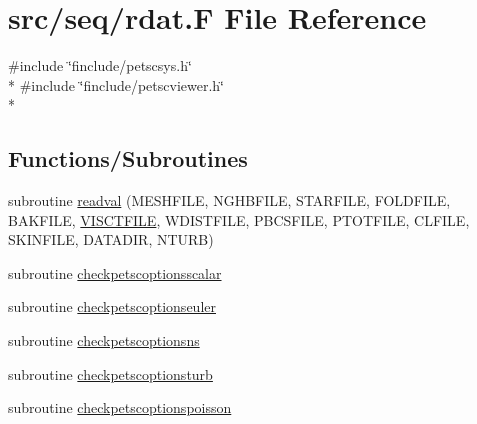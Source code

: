 \hypertarget{seq_2rdat_8_f}{\section{src/seq/rdat.F File Reference}
\label{seq_2rdat_8_f}
}
{\ttfamily \#include \char`\"{}finclude/petscsys.\-h\char`\"{}}\\*
{\ttfamily \#include \char`\"{}finclude/petscviewer.\-h\char`\"{}}\\*
\subsection*{Functions/\-Subroutines}
\begin{DoxyCompactItemize}
\item 
subroutine \hyperlink{seq_2rdat_8_f_add2908519bdf87b4bede100dbf9c7162}{readval} (M\-E\-S\-H\-F\-I\-L\-E, N\-G\-H\-B\-F\-I\-L\-E, S\-T\-A\-R\-F\-I\-L\-E, F\-O\-L\-D\-F\-I\-L\-E, B\-A\-K\-F\-I\-L\-E, \hyperlink{backup_8com_a95c1296e8e0de833d5ad9c330b97f734}{V\-I\-S\-C\-T\-F\-I\-L\-E}, W\-D\-I\-S\-T\-F\-I\-L\-E, P\-B\-C\-S\-F\-I\-L\-E, P\-T\-O\-T\-F\-I\-L\-E, C\-L\-F\-I\-L\-E, S\-K\-I\-N\-F\-I\-L\-E, D\-A\-T\-A\-D\-I\-R, N\-T\-U\-R\-B)
\item 
subroutine \hyperlink{seq_2rdat_8_f_a7d377a7825e28a8cae47ecce4b8a3498}{checkpetscoptionsscalar}
\item 
subroutine \hyperlink{seq_2rdat_8_f_a9280e83708ea9e0a97164b0e71143d8d}{checkpetscoptionseuler}
\item 
subroutine \hyperlink{seq_2rdat_8_f_ab146cfe621395692c477e2c9f80845c2}{checkpetscoptionsns}
\item 
subroutine \hyperlink{seq_2rdat_8_f_aa6622b7729ba6c3d580c36153e818f87}{checkpetscoptionsturb}
\item 
subroutine \hyperlink{seq_2rdat_8_f_a70b374c85cb4298fd2513b3f5ebd2f43}{checkpetscoptionspoisson}
\end{DoxyCompactItemize}


